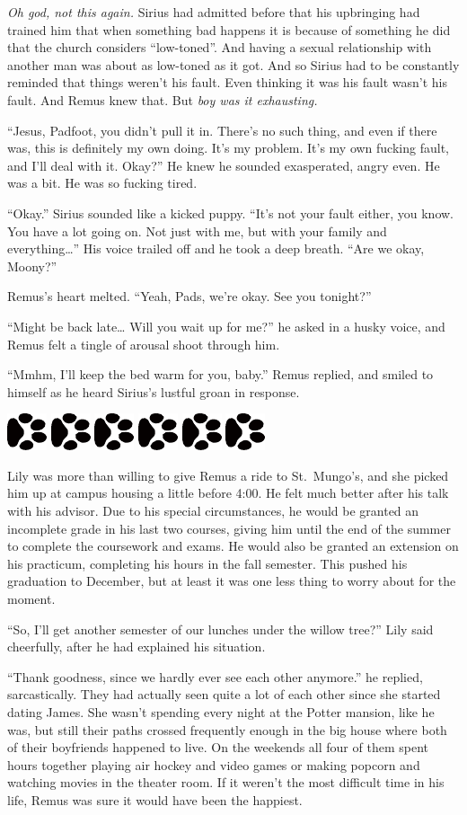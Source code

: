 \documentclass[12pt,twoside,openright]{memoir}
\newcommand{\myrulez}{	
	\begin{center}
		\hspace{.5em}
		\includegraphics[angle=60]{dogprint.pdf}
		\hspace{.5em}
		\includegraphics[angle=120]{dogprint.pdf}
		\hspace{.5em}
		\includegraphics[angle=60]{dogprint.pdf}
		\hspace{.5em}
		\includegraphics[angle=120]{dogprint.pdf}
		\hspace{.5em}
		\includegraphics[angle=60]{dogprint.pdf}
		\hspace{.5em}
		\includegraphics[angle=120]{dogprint.pdf}
		\hspace{.5em}
	\end{center}
}
\begin{document}
\textit{Oh god, not this again.} Sirius had admitted before that his upbringing had trained him that when something bad happens it is because of something he did that the church considers ``low-toned''. And having a sexual relationship with another man was about as low-toned as it got. And so Sirius had to be constantly reminded that things weren't his fault. Even thinking it was his fault wasn't his fault. And Remus knew that. But \textit{boy was it exhausting.}

``Jesus, Padfoot, you didn't pull it in. There's no such thing, and even if there was, this is definitely my own doing. It's my problem. It's my own fucking fault, and I'll deal with it. Okay?'' He knew he sounded exasperated, angry even. He was a bit. He was so fucking tired.

``Okay.'' Sirius sounded like a kicked puppy. ``It's not your fault either, you know. You have a lot going on. Not just with me, but with your family and everything…'' His voice trailed off and he took a deep breath. ``Are we okay, Moony?''

Remus's heart melted. ``Yeah, Pads, we're okay. See you tonight?''

``Might be back late… Will you wait up for me?'' he asked in a husky voice, and Remus felt a tingle of arousal shoot through him.

``Mmhm, I'll keep the bed warm for you, baby.'' Remus replied, and smiled to himself as he heard Sirius's lustful groan in response. 

\myrulez 

Lily was more than willing to give Remus a ride to St.\ Mungo's, and she picked him up at campus housing a little before
4:00. He felt much better after his talk with his advisor. Due to his special circumstances, he would be granted an incomplete grade in his last two courses, giving him until the end of the summer to complete the coursework and exams. He would also be granted an extension on his practicum, completing his hours in the fall semester. This pushed his graduation to December, but at least it was one less thing to worry about for the moment. 

``So, I'll get another semester of our lunches under the willow tree?'' Lily said cheerfully, after he had explained his situation.

``Thank goodness, since we hardly ever see each other anymore.'' he replied, sarcastically. They had actually seen quite a lot of each other since she started dating James. She wasn't spending every night at the Potter mansion, like he was, but still their paths crossed frequently enough in the big house where both of their boyfriends happened to live. On the weekends all four of them spent hours together playing air hockey and video games or making popcorn and watching movies in the theater room. If it weren't the most difficult time in his life, Remus was sure it would have been the happiest.
\end{document}
